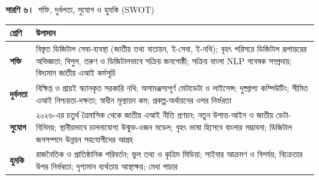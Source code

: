 \documentclass[border=10pt]{standalone}
\begin{document}
\begin{minipage}{17cm}
{\large\bfseries সারণি ৬।}\ {\large শক্তি, দুর্বলতা, সুযোগ ও হুমকি (SWOT)}\par\vspace{7pt}
\small
{}
\begin{tabularx}{\linewidth}{@{}>{\hsize=0.377\hsize\raggedright\arraybackslash}X>{\hsize=1.623\hsize\raggedright\arraybackslash}X@{}}
\arrayrulecolor{bapilrule}\toprule
\rowcolor{white}\textbf{শ্রেণি} & \textbf{উপাদান} \\
\midrule
\textbf{শক্তি} & বিস্তৃত ডিজিটাল সেবা-ব্যবস্থা (জাতীয় তথ্য বাতায়ন, ই-সেবা, ই-নথি); বৃহৎ পরিসরে ডিজিটাল রূপান্তরের অভিজ্ঞতা; বিপুল, তরুণ ও ডিজিটালভাবে সক্রিয় জনগোষ্ঠী; সক্রিয় বাংলা NLP গবেষক সম্প্রদায়; বিদ্যমান জাতীয় এআই কর্মসূচি \\
\textbf{দুর্বলতা} & বিক্ষিপ্ত ও প্রায়ই স্ক্যানকৃত সরকারি নথি; অসামঞ্জস্যপূর্ণ মেটাডেটা ও লাইসেন্স; দুষ্প্রাপ্য কম্পিউটিং; সীমিত এআই নিশ্চয়তা-দক্ষতা; স্বাধীন মূল্যায়ন কম; প্রকল্প-অর্থায়নের ওপর নির্ভরতা \\
\textbf{সুযোগ} & ২০২৬-এর চতুর্থ ত্রৈমাসিক থেকে জাতীয় এআই নীতি প্রণয়ন; নতুন উপাত্ত-আইন ও জাতীয় ডেটা-বিনিময়; স্থানীয়ভাবে চালনাযোগ্য উন্মুক্ত-ওজন মডেল; বৃহৎ ভাষা হিসেবে বাংলার সম্ভাবনা; ডিজিটাল জনসম্পদে উন্নয়ন সহযোগীদের আগ্রহ \\
\textbf{হুমকি} & রাজনৈতিক ও প্রাতিষ্ঠানিক পরিবর্তন; ভুল তথ্য ও কৃত্রিম মিডিয়া; সাইবার আক্রমণ ও বিপর্যয়; বিক্রেতার উপর নির্ভরতা; দৃশ্যমান ব্যর্থতায় আস্থাক্ষয়; মেধা পাচার \\
\bottomrule
\end{tabularx}
\par{}
\end{minipage}
\end{document}
